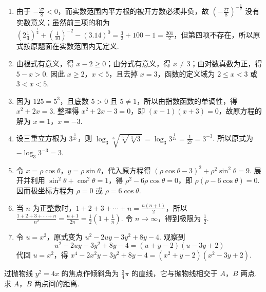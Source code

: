 \begin{solution}
\begin{enumerate}
\item 由于 \(-\frac{27}{8}<0\)，而实数范围内平方根的被开方数必须非负，故 \(\left(-\frac{27}{8}\right)^{-\frac{1}{2}}\) 没有实数意义；虽然前三项的和为 \(\left(2\frac{1}{4}\right)^{\frac{1}{2}}+\left(\frac{1}{10}\right)^{-2}-\left(3.14\right)^0=\frac{3}{2}+100-1=\frac{201}{2}\)，但第四项不存在，所以原式按原题面在实数范围内无定义.

\item 由根式有意义，得 \(x-2\geqslant0\)；由分式有意义，得 \(x\ne3\)；由对数真数为正，得 \(5-x>0\). 因此 \(x\geqslant2\)，\(x<5\)，且去掉 \(x=3\)，函数的定义域为 \(2\leqslant x<3\) 或 \(3<x<5\).

\item 因为 \(125=5^3\)，且底数 \(5>0\) 且 \(5\ne1\)，所以由指数函数的单调性，得 \(x^2+2x=3\). 整理得 \(x^2+2x-3=0\)，即 \((x-1)(x+3)=0\)，故原方程的解为 \(x=1\)，\(x=-3\).

\item 设三重立方根为 \(3^{\frac{1}{27}}\)，则 \(\log_3\sqrt[3]{\sqrt[3]{\sqrt[3]{3}}}=\log_3 3^{\frac{1}{27}}=\frac{1}{27}=3^{-3}\). 所以原式为 \(-\log_3 3^{-3}=3\).

\item 令 \(x=\rho\cos\theta\)，\(y=\rho\sin\theta\)，代入原方程得 \(\left(\rho\cos\theta-3\right)^2+\rho^2\sin^2\theta=9\). 展开并利用 \(\sin^2\theta+\cos^2\theta=1\)，得 \(\rho^2-6\rho\cos\theta=0\)，即 \(\rho\left(\rho-6\cos\theta\right)=0\). 因而极坐标方程为 \(\rho=0\) 或 \(\rho=6\cos\theta\).

\item 当 \(n\) 为正整数时，\(1+2+3+\cdots+n=\frac{n(n+1)}{2}\)，所以 \(\displaystyle\frac{1+2+3+\cdots+n}{n^2}=\frac{n+1}{2n}=\frac{1}{2}\left(1+\frac{1}{n}\right)\). 令 \(n\to\infty\)，得到极限为 \(\frac{1}{2}\).

\item 令 \(u=x^2\)，原式变为 \(u^2-2uy-3y^2+8y-4\). 观察到
\[
u^2-2uy-3y^2+8y-4=(u+y-2)(u-3y+2)
\]
代回 \(u=x^2\)，得 \(x^4-2x^2y-3y^2+8y-4=(x^2+y-2)(x^2-3y+2)\).
\end{enumerate}
\end{solution}

\begin{problem}
过抛物线 \( y^2=4x \) 的焦点作倾斜角为 \( \frac{3}{4}\pi \) 的直线，它与抛物线相交于 \(A\)，\(B\) 两点. 求 \(A\)，\(B\) 两点间的距离.
\end{problem}

